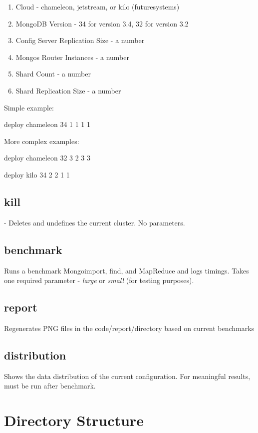 \documentclass[9pt,twocolumn,twoside]{../../styles/osajnl}
\begin{document}
\begin{enumerate}

\item Cloud - chameleon, jetstream, or kilo (futuresystems)
\item MongoDB Version - 34 for version 3.4, 32 for version 3.2
\item Config Server Replication Size - a number
\item Mongos Router Instances - a number
\item Shard Count - a number
\item Shard Replication Size - a number


\end{enumerate}

Simple example:

deploy chameleon 34 1 1 1 1

More complex examples: 

deploy chameleon 32 3 2 3 3

deploy kilo 34 2 2 1 1


\subsection{kill} - Deletes and undefines the current cluster.  No parameters.

\subsection{benchmark} Runs a benchmark Mongoimport, find, and MapReduce and logs timings.  Takes one required parameter - \emph{large} or \emph{small} (for testing purposes).

\subsection{report}  Regenerates PNG files in the code/report/directory based on current benchmarks

\subsection{distribution} Shows the data distribution of the current configuration.  For meaningful results, must be run after benchmark.  

\section{Directory Structure}
\end{document}

